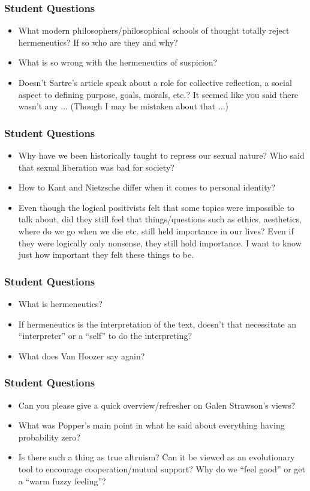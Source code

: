 \documentclass[xcolor=dvipsnames]{beamer}
\begin{document}
\begin{frame}
  \frametitle{Student Questions}
  \begin{itemize}
  \item What modern philosophers/philosophical schools of thought
    totally reject hermeneutics? If so who are they and why?
  \item What is so wrong with the hermeneutics of suspicion?
  \item Doesn't Sartre's article speak about a role for collective
    reflection, a social aspect to defining purpose, goals, morals,
    etc.? It seemed like you said there wasn't any ... (Though I may
    be mistaken about that ...)
  \end{itemize}
\end{frame}

\begin{frame}
  \frametitle{Student Questions}
  \begin{itemize}
  \item Why have we been historically taught to repress our sexual
    nature? Who said that sexual liberation was bad for society?
  \item How to Kant and Nietzsche differ when it comes to personal
    identity?
  \item Even though the logical positivists felt that some topics were
    impossible to talk about, did they still feel that
    things/questions such as ethics, aesthetics, where do we go when
    we die etc. still held importance in our lives? Even if they were
    logically only nonsense, they still hold importance. I want to
    know just how important they felt these things to be.
  \end{itemize}
\end{frame}

\begin{frame}
  \frametitle{Student Questions}
  \begin{itemize}
  \item What is hermeneutics?
  \item If hermeneutics is the interpretation of the text, doesn't
    that necessitate an ``interpreter'' or a ``self'' to do the
    interpreting?
  \item What does Van Hoozer say again?
  \end{itemize}
\end{frame}

\begin{frame}
  \frametitle{Student Questions}
  \begin{itemize}
  \item Can you please give a quick overview/refresher on Galen
    Strawson's views?
  \item What was Popper's main point in what he said about everything
    having probability zero?
  \item Is there such a thing as true altruism? Can it be viewed as an
    evolutionary tool to encourage cooperation/mutual support? Why do
    we ``feel good'' or get a ``warm fuzzy feeling''?
  \end{itemize}
\end{frame}
\end{document}
